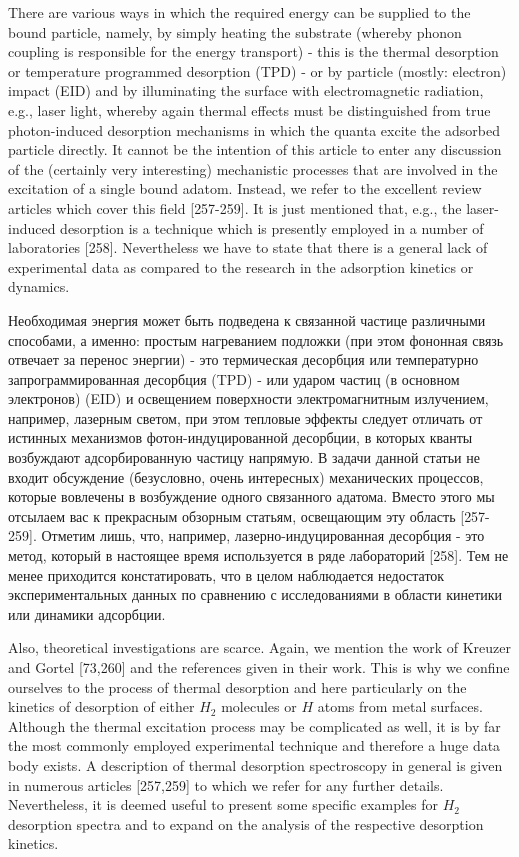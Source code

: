\documentclass[11pt]{article}
\begin{document}
    There are various ways in which the required energy can be supplied to
the bound particle, namely, by simply heating the substrate (whereby
phonon coupling is responsible for the energy transport) - this is the
thermal desorption or temperature programmed desorption (TPD) - or by
particle (mostly: electron) impact (EID) and by illuminating the surface
with electromagnetic radiation, e.g., laser light, whereby again thermal
effects must be distinguished from true photon-induced desorption
mechanisms in which the quanta excite the adsorbed particle directly. It
cannot be the intention of this article to enter any discussion of the
(certainly very interesting) mechanistic processes that are involved in
the excitation of a single bound adatom. Instead, we refer to the
excellent review articles which cover this field {[}257-259{]}. It is
just mentioned that, e.g., the laser-induced desorption is a technique
which is presently employed in a number of laboratories {[}258{]}.
Nevertheless we have to state that there is a general lack of
experimental data as compared to the research in the adsorption kinetics
or dynamics.

    Необходимая энергия может быть подведена к связанной частице различными
способами, а именно: простым нагреванием подложки (при этом фононная
связь отвечает за перенос энергии) - это термическая десорбция или
температурно запрограммированная десорбция (TPD) - или ударом частиц (в
основном электронов) (EID) и освещением поверхности электромагнитным
излучением, например, лазерным светом, при этом тепловые эффекты следует
отличать от истинных механизмов фотон-индуцированной десорбции, в
которых кванты возбуждают адсорбированную частицу напрямую. В задачи
данной статьи не входит обсуждение (безусловно, очень интересных)
механических процессов, которые вовлечены в возбуждение одного
связанного адатома. Вместо этого мы отсылаем вас к прекрасным обзорным
статьям, освещающим эту область {[}257-259{]}. Отметим лишь, что,
например, лазерно-индуцированная десорбция - это метод, который в
настоящее время используется в ряде лабораторий {[}258{]}. Тем не менее
приходится констатировать, что в целом наблюдается недостаток
экспериментальных данных по сравнению с исследованиями в области
кинетики или динамики адсорбции.

    Also, theoretical investigations are scarce. Again, we mention the work
of Kreuzer and Gortel {[}73,260{]} and the references given in their
work. This is why we confine ourselves to the process of thermal
desorption and here particularly on the kinetics of desorption of either
\(H_2\) molecules or \(H\) atoms from metal surfaces. Although the
thermal excitation process may be complicated as well, it is by far the
most commonly employed experimental technique and therefore a huge data
body exists. A description of thermal desorption spectroscopy in general
is given in numerous articles {[}257,259{]} to which we refer for any
further details. Nevertheless, it is deemed useful to present some
specific examples for \(H_2\) desorption spectra and to expand on the
analysis of the respective desorption kinetics.
\end{document}
